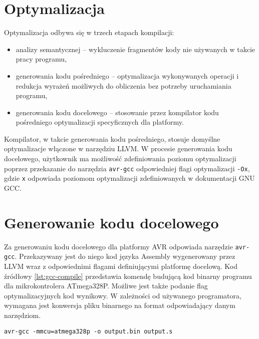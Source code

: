 \section{Optymalizacja}
Optymalizacja odbywa się w trzech etapach kompilacji:
\begin{itemize}
\item analizy semantycznej -- wykluczenie fragmentów kody nie używanych w takcie pracy programu,
\item generowania kodu pośredniego -- optymalizacja wykonywanych operacji i redukcja wyrażeń możliwych do obliczenia bez potrzeby uruchamiania programu,
\item generowania kodu docelowego -- stosowanie przez kompilator kodu pośredniego optymalizacji specyficznych dla platformy.
\end{itemize}
Kompilator, w takcie generowania kodu pośredniego, stosuje domyślne optymalizacje włączone w narzędziu LLVM. W procesie generowania kodu docelowego, użytkownik ma możliwość zdefiniowania poziomu optymalizacji poprzez przekazanie do narzędzia \lstinline|avr-gcc| odpowiedniej flagi optymalizacji \lstinline|-Ox|, gdzie \lstinline|x| odpowiada poziomom optymalizacji zdefiniowanych w dokumentacji GNU GCC.

\section{Generowanie kodu docelowego}
Za generowaniu kodu docelowego dla platformy AVR odpowiada narzędzie \lstinline|avr-gcc|. Przekazywany jest do niego kod języka Assembly wygenerowany przez LLVM wraz z odpowiednimi flagami definiującymi platformę docelową. Kod źródłowy \ref{lst:gcc-compile} przedstawia komendę budującą kod binarny programu dla mikrokontrolera ATmega328P. Możliwe jest także podanie flag optymalizacyjnych kod wynikowy. W zależności od używanego programatora, wymagana jest konwersja pliku binarnego na format odpowiadający danym narzędziom.
\begin{lstlisting}[caption={Komenda kompilująca kod wynikowy z LLVM do kodu binarnego dla ATmega328P.}, label={lst:gcc-compile}]
avr-gcc -mmcu=atmega328p -o output.bin output.s
\end{lstlisting}


